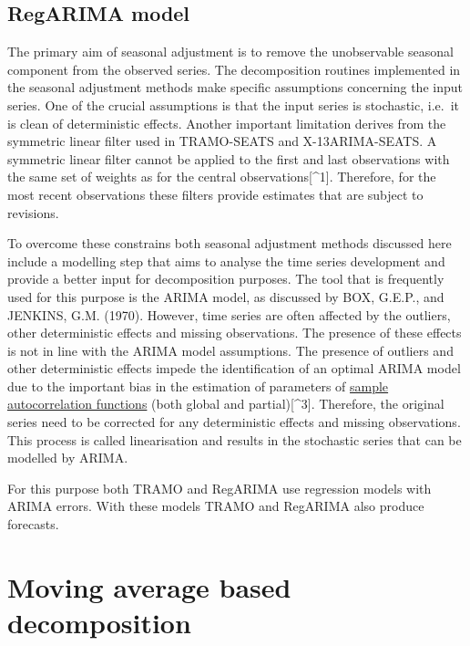 \documentclass[
  letterpaper,
  DIV=11,
  numbers=noendperiod]{scrreprt}
\begin{document}
\hypertarget{regarima-model}{%
\section{RegARIMA model}\label{regarima-model}}

The primary aim of seasonal adjustment is to remove the unobservable
seasonal component from the observed series. The decomposition routines
implemented in the seasonal adjustment methods make specific assumptions
concerning the input series. One of the crucial assumptions is that the
input series is stochastic, i.e.~it is clean of deterministic effects.
Another important limitation derives from the symmetric linear filter
used in TRAMO-SEATS and X-13ARIMA-SEATS. A symmetric linear filter
cannot be applied to the first and last observations with the same set
of weights as for the central observations{[}\^{}1{]}. Therefore, for
the most recent observations these filters provide estimates that are
subject to revisions.

To overcome these constrains both seasonal adjustment methods discussed
here include a modelling step that aims to analyse the time series
development and provide a better input for decomposition purposes. The
tool that is frequently used for this purpose is the ARIMA model, as
discussed by BOX, G.E.P., and JENKINS, G.M. (1970). However, time series
are often affected by the outliers, other deterministic effects and
missing observations. The presence of these effects is not in line with
the ARIMA model assumptions. The presence of outliers and other
deterministic effects impede the identification of an optimal ARIMA
model due to the important bias in the estimation of parameters of
\href{../theory/ACF_and_PACF.html}{sample autocorrelation functions}
(both global and partial){[}\^{}3{]}. Therefore, the original series
need to be corrected for any deterministic effects and missing
observations. This process is called linearisation and results in the
stochastic series that can be modelled by ARIMA.

For this purpose both TRAMO and RegARIMA use regression models with
ARIMA errors. With these models TRAMO and RegARIMA also produce
forecasts.

\hypertarget{moving-average-based-decomposition}{%
\chapter{Moving average based
decomposition}\label{moving-average-based-decomposition}}
\end{document}
